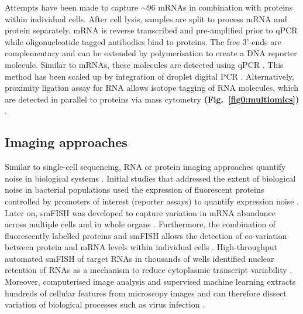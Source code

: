 Attempts have been made to capture $\sim$96 mRNAs in combination with proteins within individual cells. 
After cell lysis, samples are split to process mRNA and protein separately. 
mRNA is reverse transcribed and pre-amplified prior to \gls{qPCR} while oligonucleotide tagged antibodies bind to proteins. 
The free 3’-ends are complementary and can be extended by polymerisation to create a DNA reporter molecule. Similar to mRNAs, these molecules are detected using qPCR \citep{Darmanis2016}. 
This method has been scaled up by integration of droplet digital PCR \citep{Albayrak2016}. 
Alternatively, proximity ligation assay for RNA allows isotope tagging of RNA molecules, which are detected in parallel to proteins via mass cytometry \textbf{(Fig.~\ref{fig0:multiomics})} \citep{Frei2016}.

\subsection{Imaging approaches}

Similar to single-cell sequencing, RNA or protein imaging approaches quantify noise in biological systems \citep{Harton2017a}. 
Initial studies that addressed the extent of biological noise in bacterial populations used the expression of fluorescent proteins controlled by promoters of interest (reporter assays) to quantify expression noise \citep{Elowitz2002, Blake2003}. 
Later on, \gls{smFISH} was developed to capture variation in mRNA abundance across multiple cells \citep{Fang2013a, Lyubimova2013, Sanchez2013} and in whole organs \citep{Yang2014b}. 
Furthermore, the combination of fluorescently labelled proteins and smFISH allows the detection of co-variation between protein and mRNA levels within individual cells \citep{Taniguchi2011}. 
High-throughput automated smFISH of target RNAs in thousands of wells \citep{Battich2013} identified nuclear retention of RNAs as a mechanism to reduce cytoplasmic transcript variability \citep{Battich2015a}. 
Moreover, computerised image analysis and supervised machine learning extracts hundreds of cellular features from microscopy images and can therefore dissect variation of biological processes such as virus infection \citep{Snijder2009}.\\

